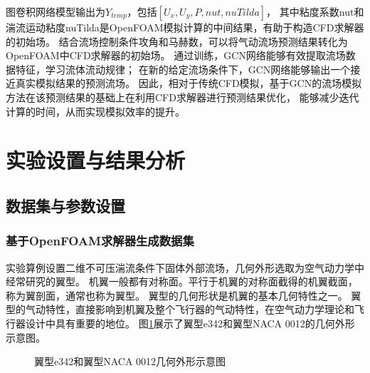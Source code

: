 图卷积网络模型输出为$Y_{temp}$，包括$[ U_x,U_y, P, nut, nuTilda]$，
其中粘度系数nut和湍流运动粘度nuTilda是OpenFOAM模拟计算的中间结果，有助于构造CFD求解器的初始场。
结合流场控制条件攻角和马赫数，可以将气动流场预测结果转化为OpenFOAM中CFD求解器的初始场。
通过训练，GCN网络能够有效提取流场数据特征，学习流体流动规律；
在新的给定流场条件下，GCN网络能够输出一个接近真实模拟结果的预测流场。
因此，相对于传统CFD模拟，基于GCN的流场模拟方法在该预测结果的基础上在利用CFD求解器进行预测结果优化，
能够减少迭代计算的时间，从而实现模拟效率的提升。


\section{实验设置与结果分析}

\subsection{数据集与参数设置}

\subsubsection{基于OpenFOAM求解器生成数据集}
实验算例设置二维不可压湍流条件下固体外部流场，几何外形选取为空气动力学中经常研究的翼型。
机翼一般都有对称面。平行于机翼的对称面截得的机翼截面，称为翼剖面，通常也称为翼型。
翼型的几何形状是机翼的基本几何特性之一。
翼型的气动特性，直接影响到机翼及整个飞行器的气动特性，在空气动力学理论和飞行器设计中具有重要的地位。
图\ref{fig:airfoil_example}展示了翼型e342和翼型NACA 0012的几何外形示意图\cite{UIUCsite}。
\begin{figure}[htb]
	\centering
	 \qquad
	\caption{翼型e342和翼型NACA 0012几何外形示意图}
	\label{fig:airfoil_example}
\end{figure}

